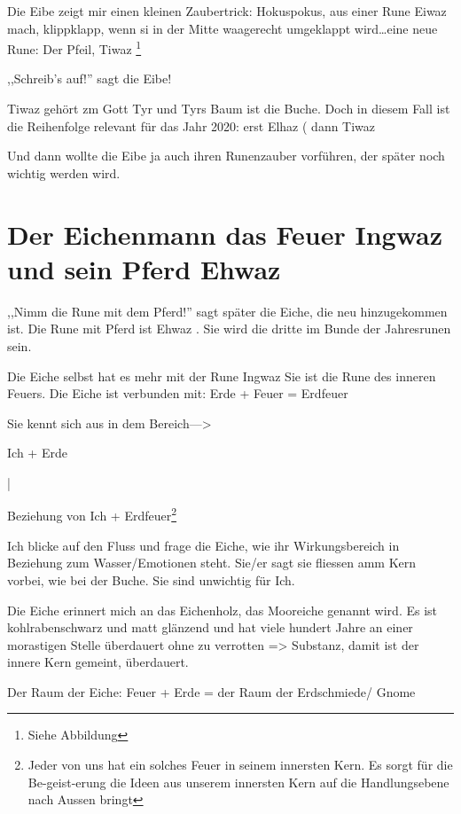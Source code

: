 \documentclass[11pt,titlepage,a5paper]{book}
\begin{document}
Die Eibe zeigt mir einen kleinen Zaubertrick: Hokuspokus, aus einer Rune Eiwaz mach, klippklapp, wenn si in der Mitte waagerecht umgeklappt wird\dots eine neue Rune: Der Pfeil, Tiwaz \footnote{Siehe Abbildung}

,,Schreib's auf!'' sagt die Eibe!

Tiwaz gehört zm Gott Tyr und Tyrs Baum ist die Buche. Doch in diesem Fall ist die Reihenfolge relevant für das Jahr 2020: erst Elhaz ( dann Tiwaz 

Und dann wollte die Eibe ja auch ihren Runenzauber vorführen, der später noch wichtig werden wird.





\section{Der Eichenmann das Feuer Ingwaz \textarc{[\withlines]\ng} und sein Pferd Ehwaz  }

,,Nimm die Rune mit dem Pferd!'' sagt später die Eiche, die neu hinzugekommen ist. Die Rune mit Pferd ist Ehwaz . Sie wird die dritte im Bunde der Jahresrunen sein.

Die Eiche selbst hat es mehr mit der Rune  Ingwaz \textarc{[\withlines]\ng} Sie ist die Rune des inneren Feuers. Die Eiche ist verbunden mit: Erde + Feuer = Erdfeuer

Sie kennt sich aus in dem Bereich--->

Ich + Erde

|

Beziehung von Ich + Erdfeuer\footnote{Jeder von uns hat ein solches Feuer in seinem innersten Kern. Es sorgt für die Be-geist-erung die Ideen aus unserem innersten Kern auf die Handlungsebene nach Aussen bringt}

Ich blicke auf den Fluss und frage die Eiche, wie ihr Wirkungsbereich in Beziehung zum Wasser/Emotionen steht. Sie/er sagt sie fliessen amm Kern vorbei, wie bei der Buche. Sie sind unwichtig für Ich.

Die Eiche erinnert mich an das Eichenholz, das Mooreiche genannt wird. Es ist kohlrabenschwarz und matt glänzend und hat viele hundert Jahre an einer morastigen Stelle überdauert ohne zu verrotten => Substanz, damit ist der innere Kern gemeint, überdauert.

Der Raum der Eiche: Feuer + Erde = der Raum der Erdschmiede/ Gnome
\end{document}
